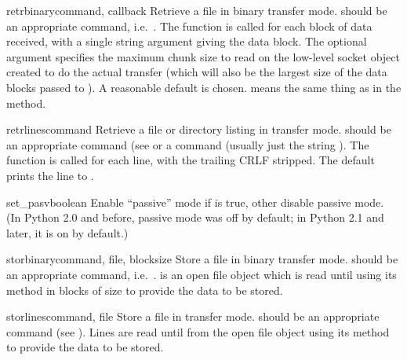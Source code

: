 \begin{methoddesc}{retrbinary}{command,
    callback}
Retrieve a file in binary transfer mode.   should be an
appropriate  command, i.e.\ .
The  function is called for each block of data received,
with a single string argument giving the data block.
The optional  argument specifies the maximum chunk size to
read on the low-level socket object created to do the actual transfer
(which will also be the largest size of the data blocks passed to
).  A reasonable default is chosen.  means the
same thing as in the  method.
\end{methoddesc}

\begin{methoddesc}{retrlines}{command}
Retrieve a file or directory listing in \ASCII{} transfer mode.
 should be an appropriate  command (see
 or a  command (usually just the string
).  The  function is called for each line,
with the trailing CRLF stripped.  The default  prints
the line to .
\end{methoddesc}

\begin{methoddesc}{set_pasv}{boolean}
Enable ``passive'' mode if  is true, other disable
passive mode.  (In Python 2.0 and before, passive mode was off by
default; in Python 2.1 and later, it is on by default.)
\end{methoddesc}

\begin{methoddesc}{storbinary}{command, file, blocksize}
Store a file in binary transfer mode.   should be an
appropriate  command, i.e.\ .
 is an open file object which is read until \EOF{} using its
 method in blocks of size  to provide the
data to be stored.
\end{methoddesc}

\begin{methoddesc}{storlines}{command, file}
Store a file in \ASCII{} transfer mode.   should be an
appropriate  command (see ).  Lines are
read until \EOF{} from the open file object  using its
 method to provide the data to be stored.
\end{methoddesc}

